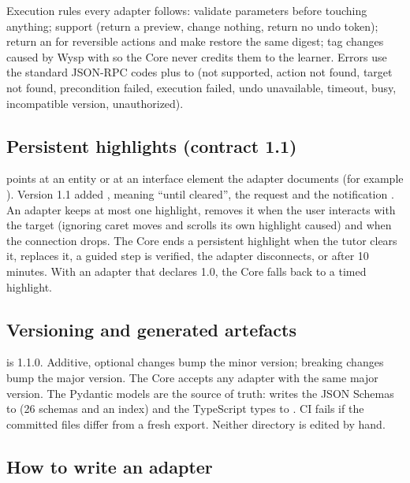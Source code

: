 Execution rules every adapter follows: validate parameters before touching anything; support  (return a preview, change nothing, return no undo token); return an  for reversible actions and make  restore the same digest; tag changes caused by Wysp with  so the Core never credits them to the learner. Errors use the standard JSON-RPC codes plus  to  (not supported, action not found, target not found, precondition failed, execution failed, undo unavailable, timeout, busy, incompatible version, unauthorized).

\subsection{Persistent highlights (contract 1.1)}

 points at an entity or at an interface element the adapter documents (for example ). Version 1.1 added , meaning ``until cleared'', the request  and the notification . An adapter keeps at most one highlight, removes it when the user interacts with the target (ignoring caret moves and scrolls its own highlight caused) and when the connection drops. The Core ends a persistent highlight when the tutor clears it, replaces it, a guided step is verified, the adapter disconnects, or after 10 minutes. With an adapter that declares 1.0, the Core falls back to a timed highlight.

\subsection{Versioning and generated artefacts}

 is 1.1.0. Additive, optional changes bump the minor version; breaking changes bump the major version. The Core accepts any adapter with the same major version. The Pydantic models are the source of truth:  writes the JSON Schemas to  (26 schemas and an index) and the TypeScript types to . CI fails if the committed files differ from a fresh export. Neither directory is edited by hand.

\subsection{How to write an adapter}

